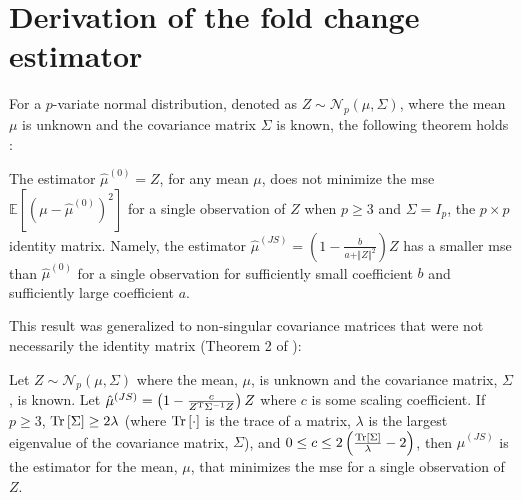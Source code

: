 \section{Derivation of the  fold change estimator}
\label{sec:JS_derivation}

For a $p$-variate normal distribution, denoted as $Z \sim \mathcal{N}_p(\mu, \Sigma)$, where the mean $\mu$ is unknown and the covariance matrix $\Sigma$ is known, the following theorem holds \cite{steinInadmissibilityUsualEstimator1956}:

\begin{theorem}
  The estimator $\hat{\mu}^{(0)} = Z$, for any mean $\mu$, does not minimize the \gls{mse} $\mathbb{E} \left[ (\mu - \hat{\mu}^{(0)})^2 \right]$ for a single observation of $Z$ when $p \ge 3$ and $\Sigma = I_p$, the $p \times p$ identity matrix.
  Namely, the estimator $\hat{\mu}^{(JS)} = \left( 1 - \frac{b}{a + \Vert Z \Vert ^2}\right) Z$ has a smaller \gls{mse} than $\hat{\mu}^{(0)}$ for a single observation for sufficiently small coefficient $b$ and sufficiently large coefficient $a$.
\end{theorem}

This result was generalized to non-singular covariance matrices that were not necessarily the identity matrix (Theorem 2 of \cite[REF][]{bockMinimaxEstimatorsMean1975}):

\begin{theorem}
  Let $Z \sim \mathcal{N}_p \left(\mu, \Sigma \right)$ where the mean, $\mu$, is unknown and the covariance matrix, $\Sigma$, is known.
  Let $\hat{\mu}^{(JS)} = \left( 1 - \frac{c}{Z^{\mathrm{T}} \Sigma^{-1} Z}\right) Z$ where $c$ is some scaling coefficient.
  If $p \ge 3$, $\mathrm{Tr} \left[ \Sigma \right] \ge 2 \lambda$ (where $\mathrm{Tr} \left[ \cdot \right]$ is the trace of a matrix, $\lambda$ is the largest eigenvalue of the covariance matrix, $\Sigma$), and $0 \le c \le 2 \left( \frac{\mathrm{Tr} \left[ \Sigma \right]}{\lambda} - 2 \right)$, then $\hat{\mu}^{(JS)}$ is the estimator for the mean, $\mu$, that minimizes the \gls{mse} for a single observation of $Z$.
  \label{thm:js}
\end{theorem}

